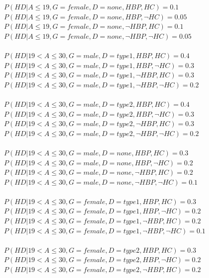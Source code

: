 \documentclass{article}
\begin{document}
$P(HD | A \leq 19, G = female, D = none, HBP, HC) = 0.1 $\\
$P(HD | A \leq 19, G = female, D = none, HBP, \neg HC) = 0.05$\\
$P(HD | A \leq 19, G = female, D = none, \neg HBP, HC) = 0.1$\\
$P(HD | A \leq 19, G = female, D = none, \neg HBP, \neg HC) = 0.05$\\
\\
$P(HD | 19 < A \leq 30, G = male, D = type1, HBP, HC) = 0.4 $\\
$P(HD | 19 < A \leq 30, G = male, D = type1, HBP, \neg HC) = 0.3$\\
$P(HD | 19 < A \leq 30, G = male, D = type1, \neg HBP, HC) = 0.3$\\
$P(HD | 19 < A \leq 30, G = male, D = type1, \neg HBP, \neg HC) = 0.2$\\
\\
$P(HD | 19 < A \leq 30, G = male, D = type2, HBP, HC) = 0.4 $\\
$P(HD | 19 < A \leq 30, G = male, D = type2, HBP, \neg HC) = 0.3$\\
$P(HD | 19 < A \leq 30, G = male, D = type2, \neg HBP, HC) = 0.3$\\
$P(HD | 19 < A \leq 30, G = male, D = type2, \neg HBP, \neg HC) = 0.2$\\
\\
$P(HD | 19 < A \leq 30, G = male, D = none, HBP, HC) = 0.3 $\\
$P(HD | 19 < A \leq 30, G = male, D = none, HBP, \neg HC) = 0.2$\\
$P(HD | 19 < A \leq 30, G = male, D = none, \neg HBP, HC) = 0.2$\\
$P(HD | 19 < A \leq 30, G = male, D = none, \neg HBP, \neg HC) = 0.1$\\
\\
$P(HD | 19 < A \leq 30, G = female, D = type1, HBP, HC) = 0.3 $\\
$P(HD | 19 < A \leq 30, G = female, D = type1, HBP, \neg HC) = 0.2$\\
$P(HD | 19 < A \leq 30, G = female, D = type1, \neg HBP, HC) = 0.2$\\
$P(HD | 19 < A \leq 30, G = female, D = type1, \neg HBP, \neg HC) = 0.1$\\
\\
$P(HD | 19 < A \leq 30, G = female, D = type2, HBP, HC) = 0.3 $\\
$P(HD | 19 < A \leq 30, G = female, D = type2, HBP, \neg HC) = 0.2$\\
$P(HD | 19 < A \leq 30, G = female, D = type2, \neg HBP, HC) = 0.2$\\
\end{document}
